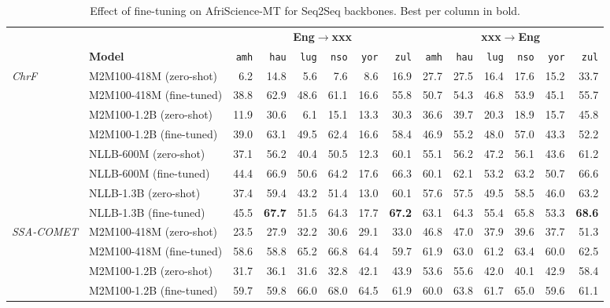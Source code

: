 \begin{table}[t!]
\centering
\footnotesize
\setlength{\tabcolsep}{4pt}
\renewcommand{\arraystretch}{1.05}
\caption{Effect of fine-tuning on AfriScience-MT for Seq2Seq backbones. Best per column in bold.}
\label{tab:pretrained_vs_finetuned}
\begin{tabular}{llrrrrrrrrrrrr}
\toprule
 & & \multicolumn{6}{c}{\textbf{Eng$\to$xxx}} & \multicolumn{6}{c}{\textbf{xxx$\to$Eng}} \\
\cmidrule(lr){3-8}\cmidrule(lr){9-14}
 & \textbf{Model} & \texttt{amh} & \texttt{hau} & \texttt{lug} & \texttt{nso} & \texttt{yor} & \texttt{zul} & \texttt{amh} & \texttt{hau} & \texttt{lug} & \texttt{nso} & \texttt{yor} & \texttt{zul} \\
\midrule
\multirow{8}{*}{\textit{ChrF}} & M2M100-418M (zero-shot) & 6.2 & 14.8 & 5.6 & 7.6 & 8.6 & 16.9 & 27.7 & 27.5 & 16.4 & 17.6 & 15.2 & 33.7 \\
 & M2M100-418M (fine-tuned) & 38.8 & 62.9 & 48.6 & 61.1 & 16.6 & 55.8 & 50.7 & 54.3 & 46.8 & 53.9 & 45.1 & 55.7 \\
 & M2M100-1.2B (zero-shot) & 11.9 & 30.6 & 6.1 & 15.1 & 13.3 & 30.3 & 36.6 & 39.7 & 20.3 & 18.9 & 15.7 & 45.8 \\
 & M2M100-1.2B (fine-tuned) & 39.0 & 63.1 & 49.5 & 62.4 & 16.6 & 58.4 & 46.9 & 55.2 & 48.0 & 57.0 & 43.3 & 52.2 \\
 & NLLB-600M (zero-shot) & 37.1 & 56.2 & 40.4 & 50.5 & 12.3 & 60.1 & 55.1 & 56.2 & 47.2 & 56.1 & 43.6 & 61.2 \\
 & NLLB-600M (fine-tuned) & 44.4 & 66.9 & 50.6 & 64.2 & 17.6 & 66.3 & 60.1 & 62.1 & 53.2 & 63.2 & 50.7 & 66.6 \\
 & NLLB-1.3B (zero-shot) & 37.4 & 59.4 & 43.2 & 51.4 & 13.0 & 60.1 & 57.6 & 57.5 & 49.5 & 58.5 & 46.0 & 63.2 \\
 & NLLB-1.3B (fine-tuned) & 45.5 & \textbf{67.7} & 51.5 & 64.3 & 17.7 & \textbf{67.2} & 63.1 & 64.3 & 55.4 & 65.8 & 53.3 & \textbf{68.6} \\
\midrule
\multirow{8}{*}{\textit{SSA-COMET}} & M2M100-418M (zero-shot) & 23.5 & 27.9 & 32.2 & 30.6 & 29.1 & 33.0 & 46.8 & 47.0 & 37.9 & 39.6 & 37.7 & 51.3 \\
 & M2M100-418M (fine-tuned) & 58.6 & 58.8 & 65.2 & 66.8 & 64.4 & 59.7 & 61.9 & 63.0 & 61.2 & 63.4 & 60.0 & 62.5 \\
 & M2M100-1.2B (zero-shot) & 31.7 & 36.1 & 31.6 & 32.8 & 42.1 & 43.9 & 53.6 & 55.6 & 42.0 & 40.1 & 42.9 & 58.4 \\
 & M2M100-1.2B (fine-tuned) & 59.7 & 59.8 & 66.0 & 68.0 & 64.5 & 61.9 & 60.0 & 63.8 & 61.7 & 65.0 & 59.6 & 61.1 \\

\end{tabular}
\end{table}
